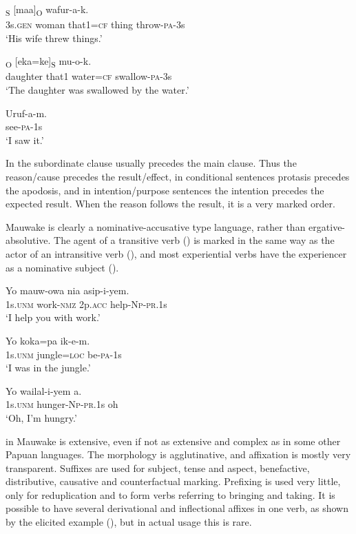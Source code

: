 \ea%
\label{ex:x656}
\gll [Ona  emeria  nain=ke]\textsubscript{S} [maa]\textsubscript{O} wafur-a-k. \\
 3s.\textsc{gen} woman  that1=\textsc{cf}  thing  throw-\textsc{pa}-3s \\
\glt `His wife threw things.'
\z


\ea%
\label{ex:x657}
\textsubscript{O} [eka=ke]\textsubscript{S} mu-o-k. \\
 daughter  that1  water=\textsc{cf} swallow-\textsc{pa}-3s     \\
\glt `The daughter was swallowed by the water.'
\z


\ea%
\label{ex:x659}
\gll Uruf-a-m. \\
 see-\textsc{pa}-1s     \\
\glt `I saw it.'
\z


In  the subordinate clause usually precedes the main clause.  Thus the reason/cause precedes the result/effect, in conditional sentences protasis precedes the apodosis, and in intention/purpose sentences the intention precedes the expected result. When the reason follows the result, it is a very marked order.

Mauwake is clearly a nominative-accusative type language, rather than ergative-absolutive. The agent of a transitive verb () is marked in the same way as the actor of an intransitive verb (), and most experiential verbs have the experiencer as a nominative subject ().

\ea%
\label{ex:x1523}
\gll Yo  mauw-owa  nia  asip-i-yem. \\
 1s.\textsc{unm}  work-\textsc{nmz}  2p.\textsc{acc}  help-\textsc{Np}-\textsc{pr}.1s     \\
\glt `I help you with work.'
\z


\ea%
\label{ex:x1524}
\gll Yo  koka=pa  ik-e-m. \\
1s.\textsc{unm}  jungle=\textsc{loc}  be-\textsc{pa}-1s      \\
\glt `I was in the jungle.'
\z


\ea%
\label{ex:x1525}
\gll Yo  wailal-i-yem  a. \\
 1s.\textsc{unm}  hunger-\textsc{Np}-\textsc{pr}.1s  oh     \\
\glt `Oh, I'm hungry.'
\z


 in Mauwake is extensive, even if not as extensive and complex as in some other Papuan languages. The morphology is agglutinative, and  affixation is mostly very transparent.  Suffixes are used for subject, tense and aspect, benefactive, distributive, causative and counterfactual marking. Prefixing is used very little, only for reduplication and to form verbs referring to bringing and taking. It is possible to have several derivational and inflectional affixes in one verb, as shown by the elicited example (), but in actual usage this is rare.



